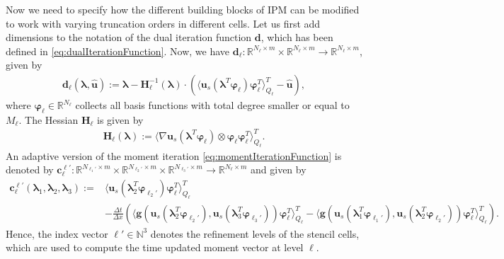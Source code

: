 Now we need to specify how the different building blocks of IPM can be modified to work with varying truncation orders in different cells. Let us first add dimensions to the notation of the dual iteration function $\bm d$, which has been defined in \eqref{eq:dualIterationFunction}. Now, we have 
$\bm{d}_{\ell}:\mathbb{R}^{N_{\ell}\times m}\times\mathbb{R}^{N_{\ell}\times m}\to\mathbb{R}^{N_{\ell}\times m}$, given by
\begin{align}\label{eq:dualIterationFunctionAd}
\bm{d}_{\ell}(\bm{\lambda},\bm{\hat{u}}):= \bm{\lambda}-\bm{H}_{\ell}^{-1}(\bm{\lambda})\cdot \left(\langle \bm u_{s}(\bm{\lambda}^T\bm{\varphi}_{\ell})\bm{\varphi}_{\ell}^T\rangle_{Q_{\ell}}^T-\bm{\hat{u}}\right),
\end{align}
where $\bm{\varphi}_{\ell}\in\mathbb{R}^{N_{\ell}}$ collects all basis functions with total degree smaller or equal to $M_\ell$. The Hessian $\bm{H}_{\ell}$ is given by 
\begin{align*}
\bm{H}_{\ell}(\bm{\lambda}) := \langle \nabla \bm{u}_{s} (\bm{\lambda}^T\bm{\varphi}_{\ell})\otimes\bm{\varphi}_{\ell}\bm{\varphi}_{\ell}^T\rangle_{Q_{\ell}}^{T}.
\end{align*}
An adaptive version of the moment iteration \eqref{eq:momentIterationFunction} is denoted by $\bm c_{\ell}^{\bm{\ell}'}:\mathbb{R}^{N_{\ell_1'}\times m}\times \mathbb{R}^{N_{\ell_2'}\times m}\times \mathbb{R}^{N_{\ell_3'}\times m}\rightarrow \mathbb{R}^{N_{\ell}\times m}$ and given by
\begin{align}\label{eq:adaptiveFVUpdate}
\bm{c}_{\ell}^{\bm{\ell}'}\left(\bm{\lambda}_{1},\bm{\lambda}_2,\bm{\lambda}_3\right):= &\langle \bm u_{s}(\bm{\lambda}_2^T\bm{\varphi}_{\ell_2'})\bm{\varphi}_{\ell}^T\rangle_{Q_{\ell}}^T \\&- \frac{\Delta t}{\Delta x}\left(\langle \bm g(\bm u_{s}(\bm{\lambda}_2^T\bm{\varphi}_{\ell_2'}),\bm u_{s}(\bm{\lambda}_3^T\bm{\varphi}_{\ell_3'}))\bm{\varphi}_{\ell}^T\rangle_{Q_{\ell}}^T-\langle \bm g(\bm u_{s}(\bm{\lambda}_{1}^T\bm{\varphi}_{\ell_1'}),\bm u_{s}(\bm{\lambda}_2^T\bm{\varphi}_{\ell_2'}))\bm{\varphi}_{\ell}^T\rangle_{Q_{\ell}}^T\right). \nonumber
\end{align}
Hence, the index vector $\bm\ell'\in\mathbb{N}^{3}$ denotes the refinement levels of the stencil cells, which are used to compute the time updated moment vector at level $\ell$.

